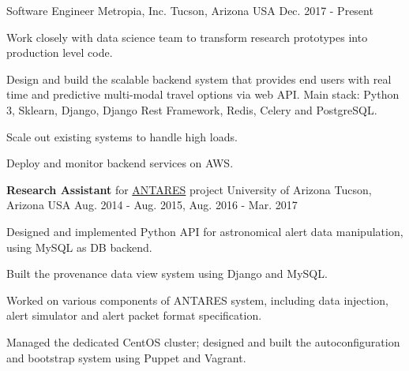 

\begin{cventries}

  \cventry
    {Software Engineer} %
    {Metropia, Inc.} %
    {Tucson, Arizona USA} %
    {Dec. 2017 - Present} %
    {
      \begin{cvitems} %
      \item {Work closely with data science team to transform
    research prototypes into production level code.}
       \item {Design and build the scalable backend system that provides end users
    with real time and predictive multi-modal travel options via web
    API. Main stack: Python 3, Sklearn, Django, Django Rest Framework,
    Redis, Celery and PostgreSQL.}
       \item {Scale out existing systems to handle high loads.}
       \item {Deploy and monitor backend services on AWS.}
      \end{cvitems}
    }

  \cventry
    {\textbf{Research Assistant} for \href{https://www.noao.edu/ANTARES/}{ANTARES} project} %
    {University of Arizona} %
    {Tucson, Arizona USA} %
    {Aug. 2014 - Aug. 2015, Aug. 2016 - Mar. 2017} %
    {
      \begin{cvitems} %
      \item {Designed and implemented Python API for astronomical
    alert data manipulation, using MySQL as DB backend.}
      \item {Built the provenance data view system using Django and MySQL.}
      \item {Worked on various components of ANTARES system,
    including data injection, alert simulator and alert packet format specification.}
        \item {Managed the dedicated CentOS cluster; designed and
    built the autoconfiguration and bootstrap 
    system using Puppet and Vagrant.}
      \end{cvitems}
    }


\end{cventries}
